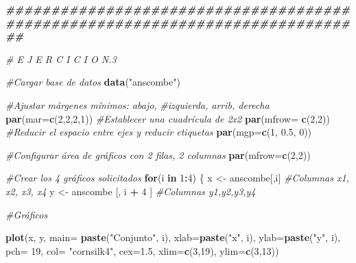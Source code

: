 \documentclass[
]{article}
\newenvironment{Shaded}{\begin{snugshade}}{\end{snugshade}}
\newcommand{\AttributeTok}[1]{\textcolor[rgb]{0.13,0.29,0.53}{#1}}
\newcommand{\CommentTok}[1]{\textcolor[rgb]{0.56,0.35,0.01}{\textit{#1}}}
\newcommand{\ControlFlowTok}[1]{\textcolor[rgb]{0.13,0.29,0.53}{\textbf{#1}}}
\newcommand{\DecValTok}[1]{\textcolor[rgb]{0.00,0.00,0.81}{#1}}
\newcommand{\DocumentationTok}[1]{\textcolor[rgb]{0.56,0.35,0.01}{\textbf{\textit{#1}}}}
\newcommand{\FloatTok}[1]{\textcolor[rgb]{0.00,0.00,0.81}{#1}}
\newcommand{\FunctionTok}[1]{\textcolor[rgb]{0.13,0.29,0.53}{\textbf{#1}}}
\newcommand{\NormalTok}[1]{#1}
\newcommand{\OtherTok}[1]{\textcolor[rgb]{0.56,0.35,0.01}{#1}}
\newcommand{\SpecialCharTok}[1]{\textcolor[rgb]{0.81,0.36,0.00}{\textbf{#1}}}
\newcommand{\StringTok}[1]{\textcolor[rgb]{0.31,0.60,0.02}{#1}}
\begin{document}
\begin{Shaded}
\begin{Highlighting}[]
\DocumentationTok{\#\#\#\#\#\#\#\#\#\#\#\#\#\#\#\#\#\#\#\#\#\#\#\#\#\#\#\#\#\#\#\#\#\#\#\#\#\#\#\#\#\#\#\#\#\#\#\#\#\#\#\#\#\#\#\#\#\#\#\#\#\#\#\#\#\#\#\#\#\#\#\#\#\#\#\#\#\#}

\CommentTok{\# E J E R C I C I O N.3 }

\CommentTok{\#Cargar base de datos }
\FunctionTok{data}\NormalTok{(}\StringTok{"anscombe"}\NormalTok{)}

\CommentTok{\#Ajustar márgenes mínimos: abajo, }
\CommentTok{\#izquierda, arrib, derecha }
\FunctionTok{par}\NormalTok{(}\AttributeTok{mar=}\FunctionTok{c}\NormalTok{(}\DecValTok{2}\NormalTok{,}\DecValTok{2}\NormalTok{,}\DecValTok{2}\NormalTok{,}\DecValTok{1}\NormalTok{))}
\CommentTok{\#Establecer una cuadrícula de 2x2 }
\FunctionTok{par}\NormalTok{(}\AttributeTok{mfrow=} \FunctionTok{c}\NormalTok{(}\DecValTok{2}\NormalTok{,}\DecValTok{2}\NormalTok{))}
\CommentTok{\#Reducir el espacio entre ejes y reducir etiquetas }
\FunctionTok{par}\NormalTok{(}\AttributeTok{mgp=}\FunctionTok{c}\NormalTok{(}\DecValTok{1}\NormalTok{, }\FloatTok{0.5}\NormalTok{, }\DecValTok{0}\NormalTok{))}

\CommentTok{\#Configurar área de gráficos con 2 filas, 2 columnas}
\FunctionTok{par}\NormalTok{(}\AttributeTok{mfrow=}\FunctionTok{c}\NormalTok{(}\DecValTok{2}\NormalTok{,}\DecValTok{2}\NormalTok{))}

\CommentTok{\#Crear los 4 gráficos solicitados }
\ControlFlowTok{for}\NormalTok{(i }\ControlFlowTok{in} \DecValTok{1}\SpecialCharTok{:}\DecValTok{4}\NormalTok{) \{}
\NormalTok{x }\OtherTok{\textless{}{-}}\NormalTok{ anscombe[,i] }\CommentTok{\#Columnas x1, x2, x3, x4 }
\NormalTok{y }\OtherTok{\textless{}{-}}\NormalTok{ anscombe [, i }\SpecialCharTok{+} \DecValTok{4}\NormalTok{ ] }\CommentTok{\#Columnas y1,y2,y3,y4}

\CommentTok{\#Gráficos }

\FunctionTok{plot}\NormalTok{(x, y, }
     \AttributeTok{main=} \FunctionTok{paste}\NormalTok{(}\StringTok{"Conjunto"}\NormalTok{, i), }
     \AttributeTok{xlab=}\FunctionTok{paste}\NormalTok{(}\StringTok{"x"}\NormalTok{, i),}
     \AttributeTok{ylab=}\FunctionTok{paste}\NormalTok{(}\StringTok{"y"}\NormalTok{, i),}
     \AttributeTok{pch=} \DecValTok{19}\NormalTok{, }
     \AttributeTok{col=} \StringTok{"cornsilk4"}\NormalTok{, }
     \AttributeTok{cex=}\FloatTok{1.5}\NormalTok{,}
     \AttributeTok{xlim=}\FunctionTok{c}\NormalTok{(}\DecValTok{3}\NormalTok{,}\DecValTok{19}\NormalTok{),}
     \AttributeTok{ylim=}\FunctionTok{c}\NormalTok{(}\DecValTok{3}\NormalTok{,}\DecValTok{13}\NormalTok{))}


\end{Highlighting}
\end{Shaded}
\end{document}
